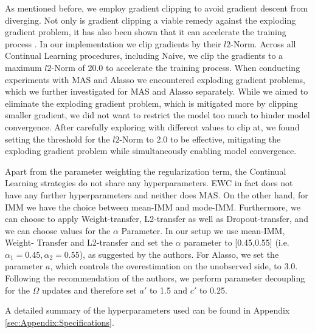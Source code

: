 As mentioned before, we employ gradient clipping to avoid gradient descent from diverging. Not only is gradient clipping a viable remedy against the exploding
gradient problem, it has also been shown that it can accelerate the training process \cite{zhang2019gradient}. In our implementation we clip gradients by their
$l2$-Norm. Across all Continual Learning procedures, including Naive, we clip the gradients to a maximum $l2$-Norm of 20.0 to accelerate the training process.
When conducting experiments with MAS and Alasso we encountered exploding gradient problems, which we further investigated for MAS and Alasso separately. While we
aimed to eliminate the exploding gradient problem, which is mitigated more by clipping smaller gradient, we did not want to restrict the model too much to hinder 
model convergence. After carefully exploring with different values to clip at, we found setting the threshold for the $l2$-Norm to 2.0 to be effective, mitigating
the exploding gradient problem while simultaneously enabling model convergence. \par
Apart from the parameter weighting the regularization term, the Continual Learning strategies do not share any hyperparameters. EWC in fact does not have
any further hyperparameters and neither does MAS. On the other hand, for IMM we have the choice between mean-IMM and mode-IMM. Furthermore, we can choose
to apply Weight-transfer, L2-transfer as well as Dropout-transfer, and we can choose values for the $\alpha$ Parameter. In our setup we use mean-IMM, Weight-
Transfer and L2-transfer and set the $\alpha$ parameter to [0.45,0.55] (i.e. $\alpha_1 = 0.45, \alpha_2 = 0.55$), as suggested by the authors. For Alasso, we set
the parameter $a$, which controls the overestimation on the unobserved side, to 3.0. Following the recommendation of the authors, we perform parameter decoupling
for the $\Omega$ updates and therefore set $a'$ to 1.5 and $c'$ to 0.25. \par
A detailed summary of the hyperparameters used can be found in Appendix \ref{sec:Appendix:Specifications}.


